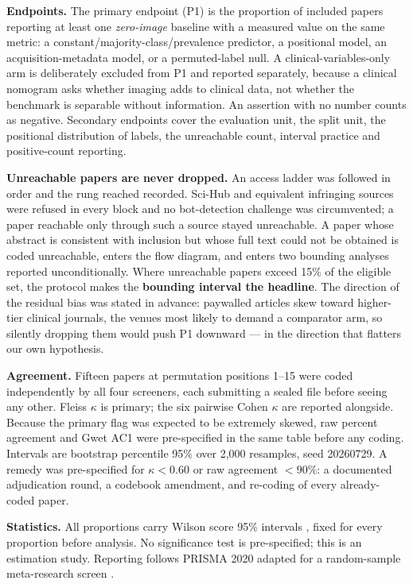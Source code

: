 \documentclass[11pt,a4paper]{article}
\begin{document}
\textbf{Endpoints.} The primary endpoint (P1) is the proportion of included
papers reporting at least one \emph{zero-image} baseline with a measured value on
the same metric: a constant/majority-class/prevalence predictor, a positional
model, an acquisition-metadata model, or a permuted-label null. A
clinical-variables-only arm is deliberately excluded from P1 and reported
separately, because a clinical nomogram asks whether imaging adds to clinical
data, not whether the benchmark is separable without information. An assertion
with no number counts as negative. Secondary endpoints cover the evaluation unit,
the split unit, the positional distribution of labels, the unreachable count,
interval practice and positive-count reporting.

\textbf{Unreachable papers are never dropped.} An access ladder was followed in
order and the rung reached recorded. Sci-Hub and equivalent infringing sources
were refused in every block and no bot-detection challenge was circumvented; a
paper reachable only through such a source stayed unreachable. A paper whose
abstract is consistent with inclusion but whose full text could not be obtained
is coded unreachable, enters the flow diagram, and enters two bounding analyses
reported unconditionally. Where unreachable papers exceed 15\% of the eligible
set, the protocol makes the \textbf{bounding interval the headline}. The
direction of the residual bias was stated in advance: paywalled articles skew
toward higher-tier clinical journals, the venues most likely to demand a
comparator arm, so silently dropping them would push P1 downward --- in the
direction that flatters our own hypothesis.

\textbf{Agreement.} Fifteen papers at permutation positions 1--15 were coded
independently by all four screeners, each submitting a sealed file before seeing
any other. Fleiss $\kappa$ \citep{fleiss1971kappa} is primary; the six pairwise Cohen
$\kappa$ are reported alongside. Because the primary flag was expected to be
extremely skewed, raw percent agreement and Gwet AC1 \citep{gwet2008ac1} were
pre-specified in the same table before any coding. Intervals are bootstrap
percentile 95\% over 2,000 resamples, seed 20260729. A remedy was pre-specified
for $\kappa<0.60$ or raw agreement $<90\%$: a documented adjudication round, a
codebook amendment, and re-coding of every already-coded paper.

\textbf{Statistics.} All proportions carry Wilson score 95\% intervals
\citep{wilson1927}, fixed for every proportion before analysis. No significance
test is pre-specified; this is an estimation study. Reporting follows PRISMA 2020
adapted for a random-sample meta-research screen \citep{page2021prisma}.
\end{document}
